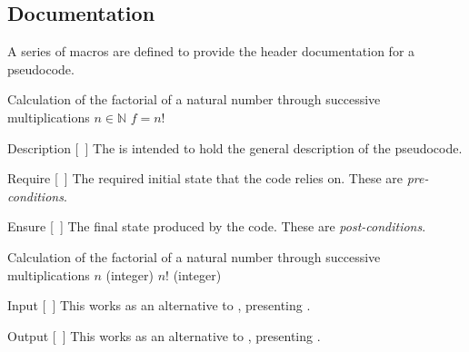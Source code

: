 \documentclass[a4paper, 11pt]{article}
\begin{document}
\begin{tcblisting}{}
    \begin{algorithmic}
        \EndIf
    \end{algorithmic}
\end{tcblisting}

\subsection{Documentation}\label{sec:documentation}
A series of macros are defined to provide the header documentation for a pseudocode.

\begin{tcblisting}{}
    \begin{algorithmic}
        \Description Calculation of the factorial of a natural number through successive multiplications
        \Require $n \in \mathbb{N}$
        \Ensure $f = n!$
    \end{algorithmic}
\end{tcblisting}

\begin{macro}{Description}
[~]
    The  is intended to hold the general description of the pseudocode.
\end{macro}

\begin{macro}{Require}
[~]
    The required initial state that the code relies on. These are \textit{pre-conditions}.
\end{macro}

\begin{macro}{Ensure}
[~]
    The final state produced by the code. These are \textit{post-conditions}.
\end{macro}

\begin{tcblisting}{}
    \begin{algorithmic}
        \Description Calculation of the factorial of a natural number through successive multiplications
        \Input $n$ (integer)
        \Output $n!$ (integer)
    \end{algorithmic}
\end{tcblisting}

\begin{macro}{Input}
[~]
    This works as an alternative to , presenting .
\end{macro}
\begin{macro}{Output}
[~]
    This works as an alternative to , presenting .
\end{macro}
\end{document}
